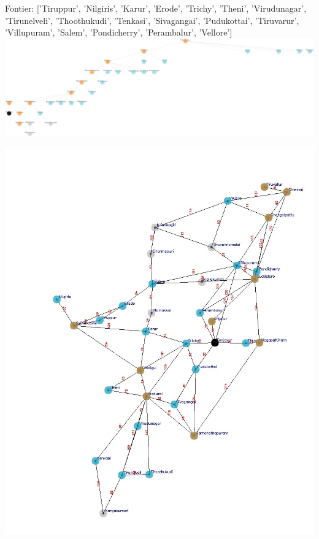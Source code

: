 \documentclass[xcolor=table]{beamer}
\begin{document}
\begin{frame}
  { \tiny Fontier: ['Tiruppur', 'Nilgiris', 'Karur', 'Erode', 'Trichy', 'Theni', 'Virudunagar', 'Tirunelveli', 'Thoothukudi', 'Tenkasi', 'Sivagangai', 'Pudukottai', 'Tiruvarur', 'Villupuram', 'Salem', 'Pondicherry', 'Perambalur', 'Vellore'] }
  \includegraphics[width=1\textwidth]{../DFSNodes/14-1.png}
  \begin{center}
    \includegraphics[height=0.45\textheight]{../DFSoutput/tamilDFS12.jpg}
  \end{center}
\end{frame}
\end{document}
